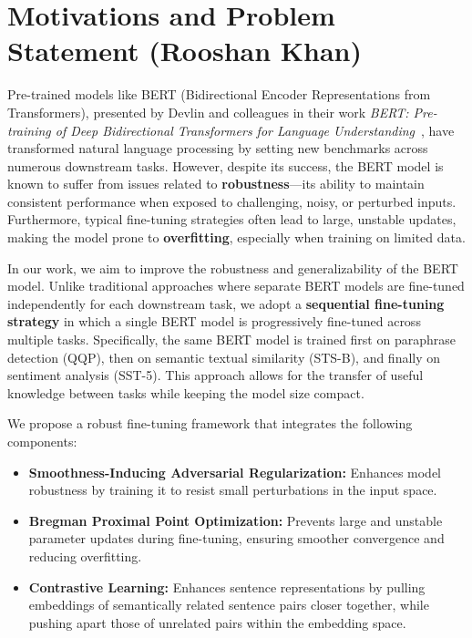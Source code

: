 
\chapter{Motivations and Problem Statement (Rooshan Khan)} %
\label{Chapter1}

Pre-trained models like BERT (Bidirectional Encoder Representations from Transformers), presented by Devlin and colleagues in their work \textit{BERT: Pre-training of Deep Bidirectional Transformers for Language Understanding}~\cite{devlin2018bert}, have transformed natural language processing by setting new benchmarks across numerous downstream tasks. However, despite its success, the BERT model is known to suffer from issues related to \textbf{robustness}—its ability to maintain consistent performance when exposed to challenging, noisy, or perturbed inputs. Furthermore, typical fine-tuning strategies often lead to large, unstable updates, making the model prone to \textbf{overfitting}, especially when training on limited data.

In our work, we aim to improve the robustness and generalizability of the BERT model. Unlike traditional approaches where separate BERT models are fine-tuned independently for each downstream task, we adopt a \textbf{sequential fine-tuning strategy} in which a single BERT model is progressively fine-tuned across multiple tasks. Specifically, the same BERT model is trained first on paraphrase detection (QQP), then on semantic textual similarity (STS-B), and finally on sentiment analysis (SST-5). This approach allows for the transfer of useful knowledge between tasks while keeping the model size compact.

We propose a robust fine-tuning framework that integrates the following components:
\begin{itemize}
    \item \textbf{Smoothness-Inducing Adversarial Regularization:} Enhances model robustness by training it to resist small perturbations in the input space.\cite{jiang2019smart}
    \item \textbf{Bregman Proximal Point Optimization:} Prevents large and unstable parameter updates during fine-tuning, ensuring smoother convergence and reducing overfitting.\cite{jiang2019smart}
    \item \textbf{Contrastive Learning:} Enhances sentence representations by pulling embeddings of semantically related sentence pairs closer together, while pushing apart those of unrelated pairs within the embedding space.

\end{itemize}

